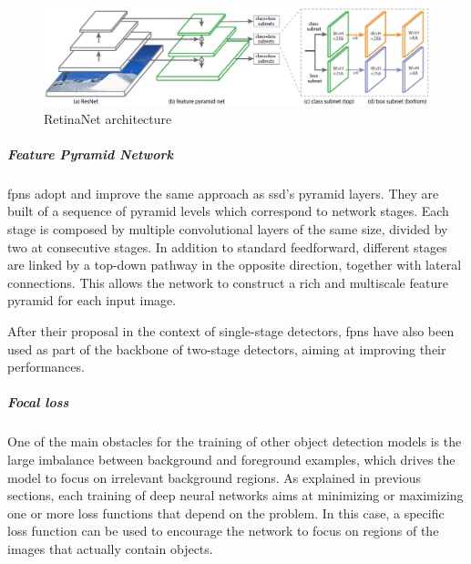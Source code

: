 \documentclass[%
    corpo=12pt,
    twoside,
    stile=classica,   
    tipotesi=magistrale,
    evenboxes,
    english,
	numerazioneromana,
]{toptesi}
\begin{document}
\begin{figure}[b]
	\centering
	\includegraphics[width=\linewidth]{imgs/retinanet.png}
	\caption{RetinaNet architecture\cite{lin2018focal}}
	\label{fig:retinanet}
\end{figure}

\subparagraph{Feature Pyramid Network}
\glspl{fpn}\cite{lin2017feature} adopt and improve the same approach as \acrshort{ssd}'s pyramid layers. They are built of a sequence of pyramid levels which correspond to network stages. Each stage is composed by multiple convolutional layers of the same size, divided by two at consecutive stages. In addition to standard feedforward, different stages are linked by a top-down pathway in the opposite direction, together with lateral connections. This allows the network to construct a rich and multiscale feature pyramid for each input image.

After their proposal in the context of single-stage detectors, \glspl{fpn} have also been used as part of the backbone of two-stage detectors, aiming at improving their performances.

\subparagraph{Focal loss}
One of the main obstacles for the training of other object detection models is the large imbalance between background and foreground examples, which drives the model to focus on irrelevant background regions.
As explained in previous sections, each training of deep neural networks aims at minimizing or maximizing one or more loss functions that depend on the problem.
In this case, a specific loss function can be used to encourage the network to focus on regions of the images that actually contain objects.
\end{document}
